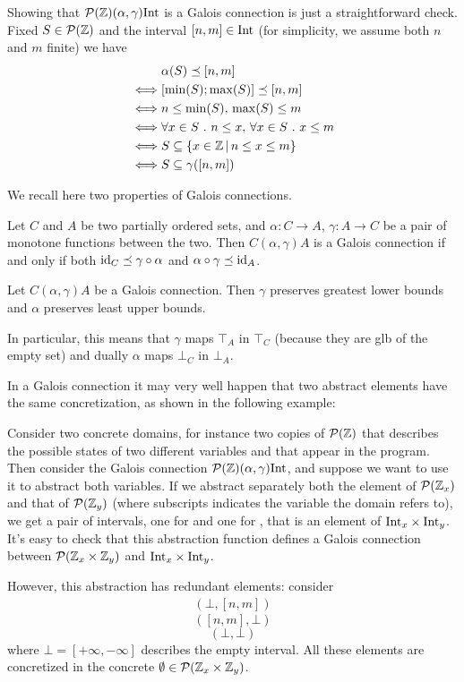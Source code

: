 \begin{example}[Intervals]
	Showing that $\mathcal{P}(\mathbb{Z}) (\alpha, \gamma) \text{Int}$ is a Galois connection is just a straightforward check. Fixed $S \in \mathcal{P}(\mathbb{Z})$ and the interval $[n, m] \in \text{Int}$ (for simplicity, we assume both $n$ and $m$ finite) we have
	\begin{align*}
		& \alpha(S) \preceq [n, m] \\
		\iff &[\min(S); \max(S)] \preceq [n, m] \\
		\iff &n \le \min(S),\, \max(S) \le m \\
		\iff &\forall x \in S\ .\ n \le x,\, \forall x \in S\ .\ x \le m \\
		\iff &S \subseteq \{ x \in \mathbb{Z} \,\vert\, n \le x \le m \} \\
		\iff &S \subseteq \gamma([n, m])
	\end{align*}
\end{example}
We recall here two properties of Galois connections.
\begin{prop}\label{ch2:th:gc-extensive-charact}
	Let $C$ and $A$ be two partially ordered sets, and $\alpha : C \rightarrow A$, $\gamma : A \rightarrow C$ be a pair of monotone functions between the two.
	Then $C (\alpha, \gamma) A$ is a Galois connection if and only if both $\text{id}_C \preceq \gamma \circ \alpha$ and $\alpha \circ \gamma \preceq \text{id}_A$.
\end{prop}
\begin{prop}\label{ch2:th:gc-adjoints-preserve-glb-lub}
	Let $C (\alpha, \gamma) A$ be a Galois connection. Then $\gamma$ preserves greatest lower bounds and $\alpha$ preserves least upper bounds.
\end{prop}
In particular, this means that $\gamma$ maps $\top_A$ in $\top_C$ (because they are glb of the empty set) and dually $\alpha$ maps $\bot_C$ in $\bot_A$.

In a Galois connection it may very well happen that two abstract elements have the same concretization, as shown in the following example:
\begin{example}
	Consider two concrete domains, for instance two copies of $\mathcal{P}(\mathbb{Z})$ that describes the possible states of two different variables  and  that appear in the program.
	Then consider the Galois connection $\mathcal{P}(\mathbb{Z}) (\alpha, \gamma) \text{Int}$, and suppose we want to use it to abstract both variables. If we abstract separately both the element of $\mathcal{P}(\mathbb{Z}_x)$ and that of $\mathcal{P}(\mathbb{Z}_y)$ (where subscripts indicates the variable the domain refers to), we get a pair of intervals, one for  and one for , that is an element of $\text{Int}_x \times \text{Int}_y$. It's easy to check that this abstraction function defines a Galois connection between $\mathcal{P}(\mathbb{Z}_x \times \mathbb{Z}_y)$ and $\text{Int}_x \times \text{Int}_y$.

	However, this abstraction has redundant elements: consider
	\begin{align*}
		(\bot, [n, m])
	\end{align*}
	\[ ([n, m], \bot) \]
	\[ (\bot, \bot) \]
	where $\bot = [+\infty, -\infty]$ describes the empty interval. All these elements are concretized in the concrete $\emptyset \in \mathcal{P}(\mathbb{Z}_x \times \mathbb{Z}_y)$.
\end{example}

